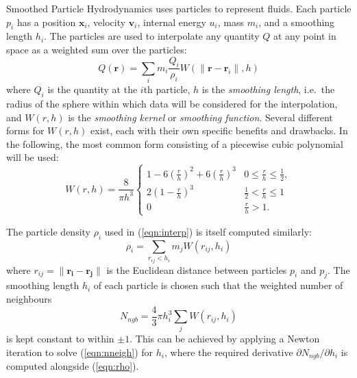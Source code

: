 \documentclass[final]{siamltex}
\newcommand{\eqn}[1]
    {(\ref{eqn:#1})}
\begin{document}
Smoothed Particle Hydrodynamics \cite{ref:Gingold1977,ref:Price2012}
uses particles to represent
fluids.
Each particle $p_i$ has a position $\mathbf x_i$,
velocity $\mathbf v_i$, internal energy $u_i$, mass $m_i$,
and a smoothing length $h_i$.
The particles are used to interpolate any quantity $Q$ at any 
point in space as a weighted sum over the particles:
%
\begin{equation}
    Q(\mathbf r) = \sum_i m_i \frac{Q_i}{\rho_i} W( \|\mathbf r - \mathbf r_i\| , h )
    \label{eqn:interp}
\end{equation}
%
where $Q_i$ is the quantity at the $i$th particle, $h$ is the
{\em smoothing length}, i.e.~the radius of the sphere within which data will
be considered for the interpolation, and
$W(r,h)$ is the {\em smoothing kernel} or {\em smoothing function}.
Several different forms for $W(r,h)$ exist, each with their own specific
benefits and drawbacks.
In the following, the most common form consisting of a piecewise
cubic polynomial will be used:
%
\begin{equation*}
    W(r,h) = \frac{8}{\pi h^3} \left\{
        \begin{array}{ll}
            1 - 6\left(\frac{r}{h}\right)^2 + 6\left(\frac{r}{h}\right)^3 & 0 \leq \frac{r}{h} \leq \frac{1}{2}, \\
            2\left( 1 - \frac{r}{h} \right)^3 & \frac{1}{2} < \frac{r}{h} \leq 1 \\
            0 & \frac{r}{h} > 1.
        \end{array}\right.
\end{equation*}

The particle density $\rho_i$ used in \eqn{interp} is itself
computed similarly:
%
\begin{equation}
    \rho_i = \sum_{r_{ij} < h_i} m_j W(r_{ij},h_i)
    \label{eqn:rho}
\end{equation}
%
where $r_{ij} = \|\mathbf{r_i}-\mathbf{r_j}\|$ is the Euclidean
distance between particles $p_i$ and $p_j$.
The smoothing length $h_i$ of each particle is chosen such that
the weighted number of neighbours
%
\begin{equation}
    N_{ngb} = \frac{4}{3}\pi h_i^3 \sum_j W( r_{ij} , h_i )
    \label{eqn:nneigh}
\end{equation}
%
is kept constant to within $\pm 1$.
This can be achieved by applying a Newton iteration to solve
\eqn{nneigh} for $h_i$, where the required derivative
$\partial N_{ngb}/\partial h_i$ is computed alongside \eqn{rho}.
\end{document}
